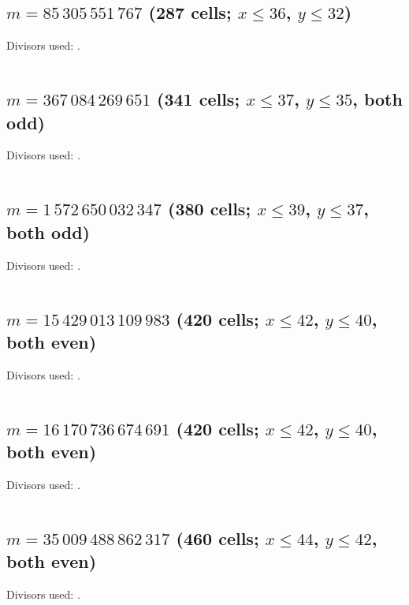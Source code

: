 \documentclass[11pt,a4paper]{article}
\theoremstyle{definition}\newtheorem{definition}[theorem]{Definition}
\theoremstyle{remark}\newtheorem{remark}[theorem]{Remark}
\begin{document}
\subsection*{$m=85\,305\,551\,767$ \quad (287 cells; $x\le 36$, $y\le 32$)}
Divisors used: .
\begin{longtable}{@{}llllll@{}}\end{longtable}
\subsection*{$m=367\,084\,269\,651$ \quad (341 cells; $x\le 37$, $y\le 35$, both odd)}
Divisors used: .
\begin{longtable}{@{}llllll@{}}\end{longtable}
\subsection*{$m=1\,572\,650\,032\,347$ \quad (380 cells; $x\le 39$, $y\le 37$, both odd)}
Divisors used: .
\begin{longtable}{@{}llllll@{}}\end{longtable}
\subsection*{$m=15\,429\,013\,109\,983$ \quad (420 cells; $x\le 42$, $y\le 40$, both even)}
Divisors used: .
\begin{longtable}{@{}llllll@{}}\end{longtable}
\subsection*{$m=16\,170\,736\,674\,691$ \quad (420 cells; $x\le 42$, $y\le 40$, both even)}
Divisors used: .
\begin{longtable}{@{}llllll@{}}\end{longtable}
\subsection*{$m=35\,009\,488\,862\,317$ \quad (460 cells; $x\le 44$, $y\le 42$, both even)}
Divisors used: .
\begin{longtable}{@{}llllll@{}}\end{longtable}
\end{document}
